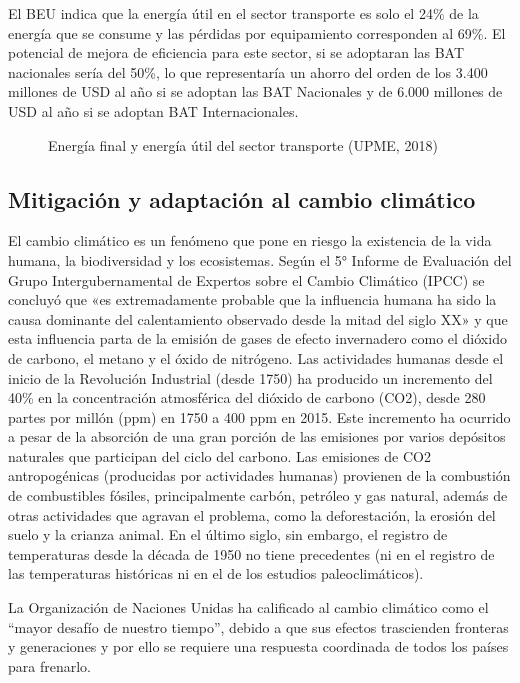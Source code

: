 El BEU indica que la energía útil en el sector transporte es solo el 24\% de la energía que se consume y las pérdidas por equipamiento corresponden al 69\%. El potencial de mejora de eficiencia para este sector, si se adoptaran las BAT nacionales sería del 50\%, lo que representaría un ahorro del orden de los 3.400 millones de USD al año si se adoptan las BAT Nacionales y de 6.000 millones de USD al año si se adoptan BAT Internacionales.

 \begin{figure}[htbp]
   \centering
   
    \caption{Energía final y energía útil del sector transporte (UPME, 2018)}
    \label{fig:pn-transporte}
\end{figure}

\subsection{Mitigación y adaptación al cambio climático}

El cambio climático es un fenómeno que pone en riesgo la existencia de la vida humana, la biodiversidad y los ecosistemas. Según el 5° Informe de Evaluación del Grupo Intergubernamental de Expertos sobre el Cambio Climático (IPCC) se concluyó que «es extremadamente probable que la influencia humana ha sido la causa dominante del calentamiento observado desde la mitad del siglo XX» y que esta influencia parta de la emisión de gases de efecto invernadero como el dióxido de carbono, el metano y el óxido de nitrógeno. Las actividades humanas desde el inicio de la Revolución Industrial (desde 1750) ha producido un incremento del 40\% en la concentración atmosférica del dióxido de carbono (CO2), desde 280 partes por millón (ppm) en 1750 a 400 ppm en 2015. Este incremento ha ocurrido a pesar de la absorción de una gran porción de las emisiones por varios depósitos naturales que participan del ciclo del carbono. Las emisiones de CO2 antropogénicas (producidas por actividades humanas) provienen de la combustión de combustibles fósiles, principalmente carbón, petróleo y gas natural, además de otras actividades que agravan el problema, como la deforestación, la erosión del suelo y la crianza animal. En el último siglo, sin embargo, el registro de temperaturas desde la década de 1950 no tiene precedentes (ni en el registro de las temperaturas históricas ni en el de los estudios paleoclimáticos). \label{Manual de Argumentación}

La Organización de Naciones Unidas ha calificado al cambio climático como el “mayor desafío de nuestro tiempo”, debido a que sus efectos trascienden fronteras y generaciones y por ello se requiere una respuesta coordinada de todos los países para frenarlo. \cite{Plan_Energetico-2050}

